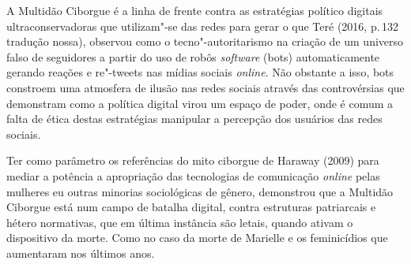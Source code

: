 A Multidão Ciborgue é a linha de frente contra as estratégias político
digitais ultraconservadoras que utilizam"-se das redes para gerar o que
Teré (2016, p.\,132 tradução nossa), observou como o tecno"-autoritarismo
na criação de um universo falso de seguidores a partir do uso de robôs
\emph{software} (bots) automaticamente gerando reações e re"-tweets nas mídias
sociais \emph{online}. Não obstante a isso, bots constroem uma atmosfera de
ilusão nas redes sociais através das controvérsias que demonstram como a
política digital virou um espaço de poder, onde é comum a falta de ética
destas estratégias manipular a percepção dos usuários das redes sociais.

Ter como parâmetro os referências do mito ciborgue de Haraway (2009)
para mediar a potência a apropriação das tecnologias de comunicação
\emph{online} pelas mulheres eu outras minorias sociológicas de gênero,
demonstrou que a Multidão Ciborgue está num campo de batalha digital,
contra estruturas patriarcais e hétero normativas, que em última
instância são letais, quando ativam o dispositivo da morte. Como no caso
da morte de Marielle e os feminicídios que aumentaram nos últimos anos.


